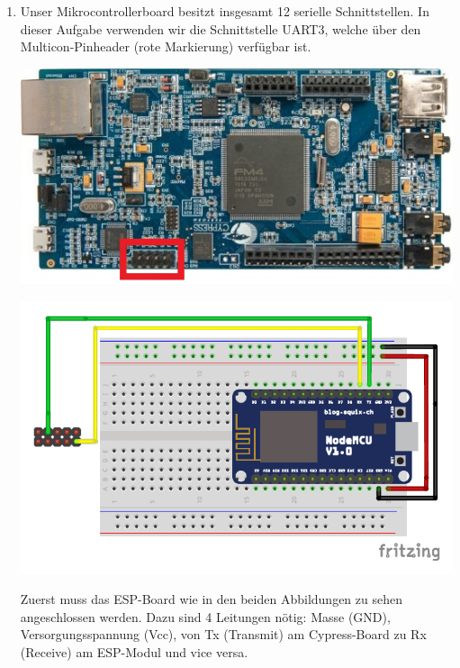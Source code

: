 \begin{enumerate}
	\item Unser Mikrocontrollerboard besitzt insgesamt 12 serielle Schnittstellen. In dieser Aufgabe verwenden wir die Schnittstelle UART3, welche über den Multicon-Pinheader (rote Markierung) verfügbar ist. 
	
		
	\begin{minipage}{.4\textwidth}
		\centering
		\includegraphics[width=\textwidth]{./05_c/figures/s6e2cc.jpg}
	\end{minipage}
	\begin{minipage}{.5\textwidth}		
		\centering
		\includegraphics[width=\textwidth]{./05_c/figures/wsnWiring_Steckplatine.pdf}
	\end{minipage}

	Zuerst muss das ESP-Board wie in den beiden Abbildungen zu sehen angeschlossen werden. Dazu sind 4 Leitungen nötig: Masse (GND), Versorgungsspannung (Vcc), von Tx (Transmit) am Cypress-Board zu Rx (Receive) am ESP-Modul und vice versa.


\end{enumerate}
